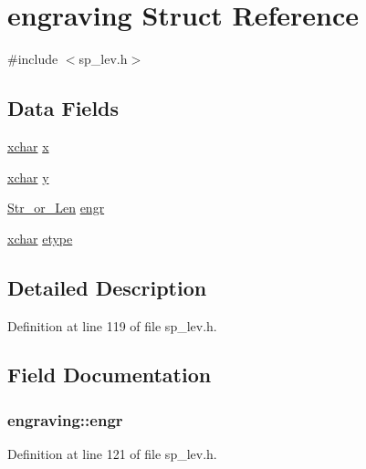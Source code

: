\hypertarget{structengraving}{\section{engraving Struct Reference}
\label{structengraving}
}


{\ttfamily \#include $<$sp\+\_\+lev.\+h$>$}

\subsection*{Data Fields}
\begin{DoxyCompactItemize}
\item 
\hyperlink{global_8h_a2043b7d01ce89f4ee2fa6c345a752d32}{xchar} \hyperlink{structengraving_a8f28b49b2f2b90a9227855bdbb4de2ab}{x}
\item 
\hyperlink{global_8h_a2043b7d01ce89f4ee2fa6c345a752d32}{xchar} \hyperlink{structengraving_a1b6846c11b9bcac6198bcb904a4f531f}{y}
\item 
\hyperlink{sp__lev_8h_ac575b18cce85a1027632cac53c2c42ac}{Str\+\_\+or\+\_\+\+Len} \hyperlink{structengraving_a1255139d50d1e9e12a229d32a0422ae8}{engr}
\item 
\hyperlink{global_8h_a2043b7d01ce89f4ee2fa6c345a752d32}{xchar} \hyperlink{structengraving_a03aa435dd8c489b0803f9f4a10ef92b2}{etype}
\end{DoxyCompactItemize}


\subsection{Detailed Description}


Definition at line 119 of file sp\+\_\+lev.\+h.



\subsection{Field Documentation}
\hypertarget{structengraving_a1255139d50d1e9e12a229d32a0422ae8}{
\subsubsection[{engr}]{ engraving\+::engr}}\label{structengraving_a1255139d50d1e9e12a229d32a0422ae8}


Definition at line 121 of file sp\+\_\+lev.\+h.



